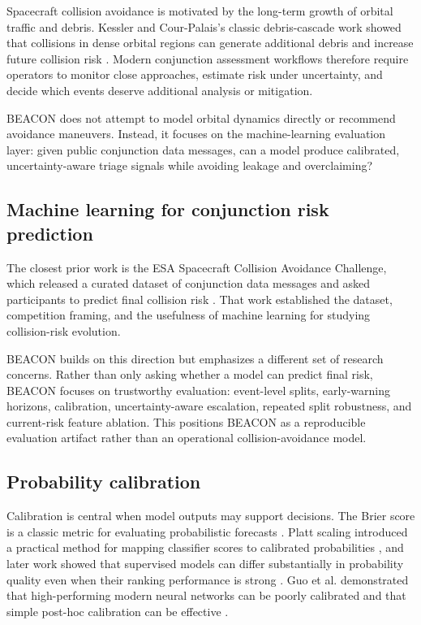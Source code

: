\documentclass[11pt]{article}
\begin{document}
Spacecraft collision avoidance is motivated by the long-term growth of orbital traffic and debris. Kessler and Cour-Palais's classic debris-cascade work showed that collisions in dense orbital regions can generate additional debris and increase future collision risk \citep{kessler1978collision}. Modern conjunction assessment workflows therefore require operators to monitor close approaches, estimate risk under uncertainty, and decide which events deserve additional analysis or mitigation.

BEACON does not attempt to model orbital dynamics directly or recommend avoidance maneuvers. Instead, it focuses on the machine-learning evaluation layer: given public conjunction data messages, can a model produce calibrated, uncertainty-aware triage signals while avoiding leakage and overclaiming?

\subsection{Machine learning for conjunction risk prediction}

The closest prior work is the ESA Spacecraft Collision Avoidance Challenge, which released a curated dataset of conjunction data messages and asked participants to predict final collision risk \citep{uriot2020spacecraft}. That work established the dataset, competition framing, and the usefulness of machine learning for studying collision-risk evolution.

BEACON builds on this direction but emphasizes a different set of research concerns. Rather than only asking whether a model can predict final risk, BEACON focuses on trustworthy evaluation: event-level splits, early-warning horizons, calibration, uncertainty-aware escalation, repeated split robustness, and current-risk feature ablation. This positions BEACON as a reproducible evaluation artifact rather than an operational collision-avoidance model.

\subsection{Probability calibration}

Calibration is central when model outputs may support decisions. The Brier score is a classic metric for evaluating probabilistic forecasts \citep{brier1950verification}. Platt scaling introduced a practical method for mapping classifier scores to calibrated probabilities \citep{platt1999probabilistic}, and later work showed that supervised models can differ substantially in probability quality even when their ranking performance is strong \citep{niculescu2005predicting}. Guo et al. demonstrated that high-performing modern neural networks can be poorly calibrated and that simple post-hoc calibration can be effective \citep{guo2017calibration}.
\end{document}
